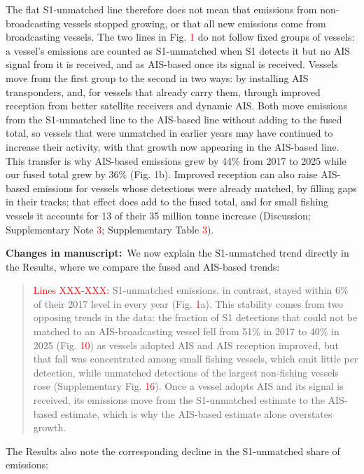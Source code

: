 \documentclass[11pt]{article}
\newcommand{\changes}{\par\medskip\noindent%
  \textbf{\textcolor{changegreen}{Changes in manuscript:}}\ }
\begin{document}
The flat S1-unmatched line therefore does not mean that emissions from non-broadcasting vessels stopped growing, or that all new emissions come from broadcasting vessels. The two lines in Fig. \textcolor{red}{1} do not follow fixed groups of vessels: a vessel's emissions are counted as S1-unmatched when S1 detects it but no AIS signal from it is received, and as AIS-based once its signal is received. Vessels move from the first group to the second in two ways: by installing AIS transponders, and, for vessels that already carry them, through improved reception from better satellite receivers and dynamic AIS. Both move emissions from the S1-unmatched line to the AIS-based line without adding to the fused total, so vessels that were unmatched in earlier years may have continued to increase their activity, with that growth now appearing in the AIS-based line. This transfer is why AIS-based emissions grew by 44\% from 2017 to 2025 while our fused total grew by 36\% (Fig. \textcolor{red}{1}b). Improved reception can also raise AIS-based emissions for vessels whose detections were already matched, by filling gaps in their tracks; that effect does add to the fused total, and for small fishing vessels it accounts for 13 of their 35 million tonne increase (Discussion; Supplementary Note \textcolor{red}{3}; Supplementary Table \textcolor{red}{3}).

\changes We now explain the S1-unmatched trend directly in the Results, where we compare the fused and AIS-based trends:

\begin{quote}
\textcolor{red}{Lines XXX-XXX:}
S1-unmatched emissions, in contrast, stayed within 6\% of their 2017 level in every year (Fig. \textcolor{red}{1}a). This stability comes from two opposing trends in the data: the fraction of S1 detections that could not be matched to an AIS-broadcasting vessel fell from 51\% in 2017 to 40\% in 2025 (Fig. \textcolor{red}{10}) as vessels adopted AIS and AIS reception improved, but that fall was concentrated among small fishing vessels, which emit little per detection, while unmatched detections of the largest non-fishing vessels rose (Supplementary Fig. \textcolor{red}{16}). Once a vessel adopts AIS and its signal is received, its emissions move from the S1-unmatched estimate to the AIS-based estimate, which is why the AIS-based estimate alone overstates growth.
\end{quote}

The Results also note the corresponding decline in the S1-unmatched share of emissions:
\end{document}
